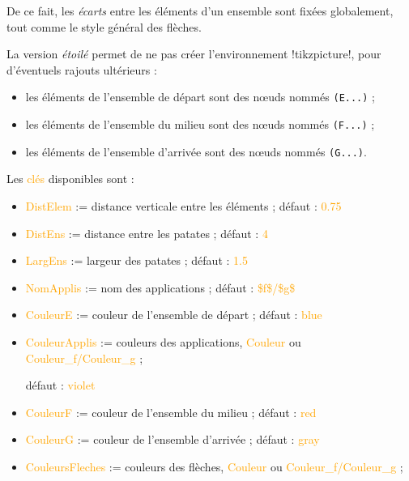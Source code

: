 \documentclass[french,a4paper,11pt]{article}
\newcommand\Cle[1]{{\small\sffamily\textlangle \textcolor{orange}{#1}\textrangle}}
\begin{document}
{{\begin{noteblock}
De ce fait, les \textit{écarts} entre les éléments d'un ensemble sont fixées globalement, tout comme le style général des flèches.
\end{noteblock}

\begin{tipblock}
La version \textit{étoilé} permet de ne pas créer l'environnement \motcletex!tikzpicture!, pour d'éventuels rajouts ultérieurs :

\begin{itemize}
	\item les éléments de l'ensemble de départ sont des nœuds nommés \verb!(E...)! ;
	\item les éléments de l'ensemble du milieu sont des nœuds nommés \verb!(F...)! ;
	\item les éléments de l'ensemble d'arrivée sont des nœuds nommés \verb!(G...)!.
\end{itemize}
\vspace*{-\baselineskip}\leavevmode
\end{tipblock}

\begin{tipblock}
Les \Cle{clés} disponibles sont :

\begin{itemize}
	\item \Cle{DistElem} := distance verticale entre les éléments ; \hfill{}défaut : \Cle{0.75}
	\item \Cle{DistEns} := distance entre les \og patates \fg{} ; \hfill{}défaut : \Cle{4}
	\item \Cle{LargEns} := largeur des \og patates \fg{} ; \hfill{}défaut : \Cle{1.5}
	\item \Cle{NomApplis} := nom des applications ; \hfill{}défaut : \Cle{\$f\$/\$g\$}
	\item \Cle{CouleurE} := couleur de l'ensemble de départ ; \hfill{}défaut : \Cle{blue}
	\item \Cle{CouleurApplis} := couleurs des applications, \Cle{Couleur} ou \Cle{Couleur\_f/Couleur\_g} ;

	\hfill{}défaut : \Cle{violet}
	\item \Cle{CouleurF} := couleur de l'ensemble du milieu ; \hfill{}défaut : \Cle{red}
	\item \Cle{CouleurG} := couleur de l'ensemble d'arrivée ; \hfill{}défaut : \Cle{gray}
	\item \Cle{CouleursFleches} := couleurs des flèches, \Cle{Couleur} ou \Cle{Couleur\_f/Couleur\_g} ;


\end{itemize}
\end{tipblock}}}
\end{document}
